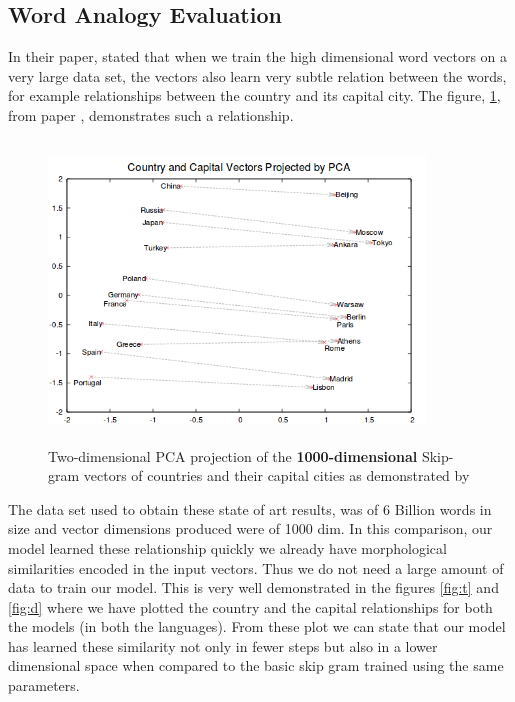 \subsection{Word Analogy Evaluation}
In their paper, \cite{mikolov2013efficient} stated that when we train the high dimensional word vectors on a very large data set, the vectors also learn very subtle relation between the words, for example relationships between the country and its capital city.  The figure, \ref{fig:t3}, from paper \cite{mikolov2013distributed}, demonstrates such a relationship. 
\begin{figure}[H]
	\centering
	\includegraphics[width=10cm,height=8cm,keepaspectratio]{files/3.png}
	\caption{ Two-dimensional PCA projection of the \textbf{1000-dimensional} Skip-gram vectors of countries and their capital cities as demonstrated by \cite{mikolov2013distributed}}
	\label{fig:t3}
\end{figure}
The data set used to obtain these state of art results, was of 6 Billion words in size and vector dimensions produced were of 1000 dim. In this comparison, our model learned these relationship quickly  we already have morphological similarities encoded in the input vectors. Thus we do not need a large amount of data to train our model. This is very well demonstrated in the figures \ref{fig:t} and \ref{fig:d} where we have plotted the country and the capital relationships for both the models (in both the languages). From these plot we can state that our model has learned these similarity not only in fewer steps but also in a lower dimensional space when compared to the basic skip gram trained using the same parameters. 
